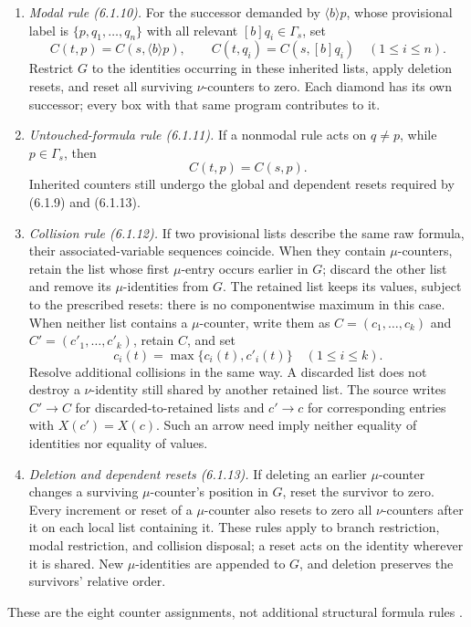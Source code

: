 \begin{enumerate}
\item \emph{Modal rule (6.1.10).}
For the successor demanded by \(\langle b\rangle p\),
whose provisional label is \(\{p,q_1,\ldots,q_n\}\)
with all relevant \([b]q_i\in\Gamma_s\), set
\[
 C(t,p)=C(s,\langle b\rangle p),\qquad
 C(t,q_i)=C(s,[b]q_i)\quad(1\leq i\leq n).
\]
Restrict \(G\) to the identities occurring in these inherited
lists, apply deletion resets, and reset all surviving
\(\nu\)-counters to zero. Each diamond has its own successor;
every box with that same program contributes to it.

\item \emph{Untouched-formula rule (6.1.11).}
If a nonmodal rule acts on \(q\ne p\), while
\(p\in\Gamma_s\), then
\[
 C(t,p)=C(s,p).
\]
Inherited counters still undergo the global and dependent resets
required by (6.1.9) and (6.1.13).

\item \emph{Collision rule (6.1.12).}
If two provisional lists describe the same raw formula, their
associated-variable sequences coincide. When they contain
\(\mu\)-counters, retain the list whose first \(\mu\)-entry
occurs earlier in \(G\); discard the other list and remove its
\(\mu\)-identities from \(G\). The retained list keeps its
values, subject to the prescribed resets: there is no
componentwise maximum in this case. When neither list contains a
\(\mu\)-counter, write them as \(C=(c_1,\ldots,c_k)\)
and \(C'=(c'_1,\ldots,c'_k)\), retain \(C\), and set
\[
 c_i(t)=\max\{c_i(t),c'_i(t)\}\quad(1\leq i\leq k).
\]
Resolve additional collisions in the same way. A discarded list
does not destroy a \(\nu\)-identity still shared by another
retained list. The source writes \(C'\longrightarrow C\)
for discarded-to-retained lists and \(c'\longrightarrow c\)
for corresponding entries with \(X(c')=X(c)\). Such an arrow
need imply neither equality of identities nor equality of values.

\item \emph{Deletion and dependent resets (6.1.13).}
If deleting an earlier \(\mu\)-counter changes a surviving
\(\mu\)-counter's position in \(G\), reset the survivor to
zero. Every increment or reset of a \(\mu\)-counter also
resets to zero all \(\nu\)-counters after it on each local list
containing it. These rules apply to branch restriction, modal
restriction, and collision disposal; a reset acts on the identity
wherever it is shared. New \(\mu\)-identities are appended to
\(G\), and deletion preserves the survivors' relative order.
\end{enumerate}
These are the eight counter assignments, not additional structural
formula rules \cite[eqs.~(6.1.6)--(6.1.13), pp.~343--344]{Kozen1983}.

